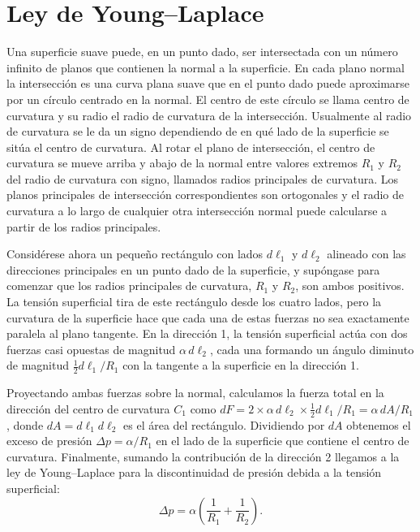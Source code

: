 \section{Ley de Young--Laplace}

Una superficie suave puede, en un punto dado, ser intersectada con un número infinito de planos que contienen la normal a la superficie. En cada plano normal la intersección es una curva plana suave que en el punto dado puede aproximarse por un círculo centrado en la normal. El centro de este círculo se llama centro de curvatura y su radio el radio de curvatura de la intersección. Usualmente al radio de curvatura se le da un signo dependiendo de en qué lado de la superficie se sitúa el centro de curvatura. Al rotar el plano de intersección, el centro de curvatura se mueve arriba y abajo de la normal entre valores extremos $R_1$ y $R_2$ del radio de curvatura con signo, llamados radios principales de curvatura. Los planos principales de intersección correspondientes son ortogonales y el radio de curvatura a lo largo de cualquier otra intersección normal puede calcularse a partir de los radios principales.

\figuraCurvaturasPrincipales

Considérese ahora un pequeño rectángulo con lados $d\ell_1$ y $d\ell_2$ alineado con las direcciones principales en un punto dado de la superficie, y supóngase para comenzar que los radios principales de curvatura, $R_1$ y $R_2$, son ambos positivos. La tensión superficial tira de este rectángulo desde los cuatro lados, pero la curvatura de la superficie hace que cada una de estas fuerzas no sea exactamente paralela al plano tangente. En la dirección 1, la tensión superficial actúa con dos fuerzas casi opuestas de magnitud $\alpha\, d\ell_2$, cada una formando un ángulo diminuto de magnitud $\tfrac{1}{2}d\ell_1/R_1$ con la tangente a la superficie en la dirección 1.

\figuraElementoYoungLaplace

Proyectando ambas fuerzas sobre la normal, calculamos la fuerza total en la dirección del centro de curvatura $C_1$ como $dF = 2\times\alpha\, d\ell_2 \times \tfrac{1}{2}d\ell_1/R_1 = \alpha\, dA/R_1$, donde $dA = d\ell_1 d\ell_2$ es el área del rectángulo. Dividiendo por $dA$ obtenemos el exceso de presión $\Delta p = \alpha/R_1$ en el lado de la superficie que contiene el centro de curvatura. Finalmente, sumando la contribución de la dirección 2 llegamos a la ley de Young--Laplace para la discontinuidad de presión debida a la tensión superficial:
$$ \Delta p = \alpha\left(\frac{1}{R_1} + \frac{1}{R_2}\right). $$

